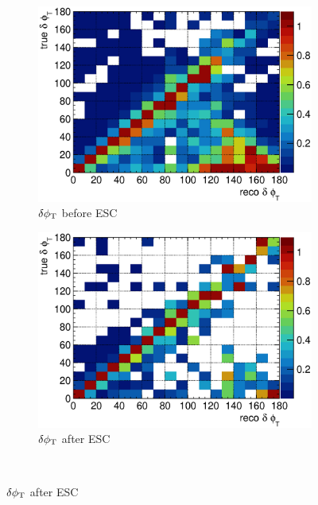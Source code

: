 \begin{figure}
          \\
          \begin{subfigure}[b]{\dbfigwid\textwidth}
               \centering
               \includegraphics[width=\textwidth]{figures/perf/tki/dphitcolnor_resmat_al13.eps}
               \caption{$\delta\phi_\textrm{T}$ before ESC}
               \label{subfig:esc-dphit-bfesc}
          \end{subfigure}
          \begin{subfigure}[b]{\dbfigwid\textwidth}
               \centering
               \includegraphics[width=\textwidth]{figures/perf/tki/dphitcolnor_resmat_al14.eps}
               \caption{$\delta\phi_\textrm{T}$ after ESC}
               \label{subfig:esc-dphit-afesc}
          \end{subfigure}
          \\

\end{figure}
